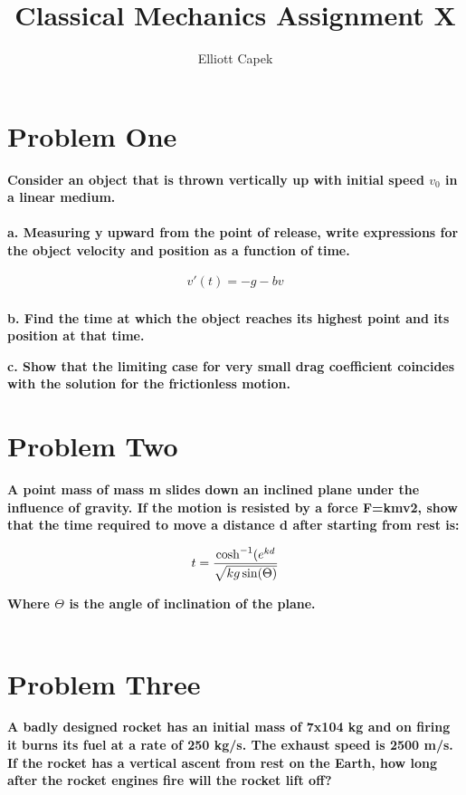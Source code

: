 \documentclass[10pt]{article} %
\title{Classical Mechanics Assignment X}
\author{Elliott Capek}
\begin{document}
\maketitle{}

\section{Problem One}
\textbf{Consider an object that is thrown vertically up with initial speed $v_0$ in a linear medium.} \\ \\

\textbf{a. Measuring y upward from the point of release, write expressions for the object velocity and position as a function of time.}

\begin{align*}
  v'(t) = -g - bv\\
  
\end{align*}

\textbf{b. Find the time at which the object reaches its highest point and its position at that time.}

\textbf{c. Show that the limiting case for very small drag coefficient coincides with the solution for the frictionless motion.}




\vspace{1 cm}

\section{Problem Two}
\textbf{A point mass of mass m slides down an inclined plane under the influence of gravity. If the motion is resisted by a force F=kmv2, show that the time required to move a distance d after starting from rest is:}

\begin{equation*}
  t = \frac{\cosh^{-1}(e^{kd}}{\sqrt{kg\sin(\Theta)}}\\
\end{equation*}

\textbf{Where $\Theta$ is the angle of inclination of the plane.} \\ \\





\vspace{1 cm}

\section{Problem Three}
\textbf{A badly designed rocket has an initial mass of 7x104 kg and on firing it burns its fuel at a rate of 250 kg/s. The exhaust speed is 2500 m/s. If the rocket has a vertical ascent from rest on the Earth, how long after the rocket engines fire will the rocket lift off?} \\ \\
\vspace{1 cm}
\end{document}
